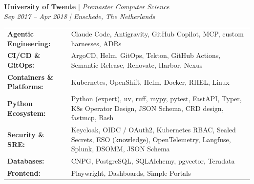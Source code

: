 \documentclass[a4paper]{deedy-resume} %
\begin{document}
\noindent \textbf{University of Twente} | \textit{Premaster Computer Science} \\
\textit{Sep 2017 – Apr 2018 | Enschede, The Netherlands}

\begin{tabular}{ll}
\textbf{Agentic Engineering:} & Claude Code, Antigravity, GitHub Copilot, MCP, custom harnesses, ADRs \\
\textbf{CI/CD \& GitOps:} & ArgoCD, Helm, GitOps, Tekton, GitHub Actions, Semantic Release, Renovate, Harbor, Nexus \\
\textbf{Containers \& Platforms:} & Kubernetes, OpenShift, Helm, Docker, RHEL, Linux \\
\textbf{Python Ecosystem:} & Python (expert), uv, ruff, mypy, pytest, FastAPI, Typer, K8s Operator Design, JSON Schema, CRD design, fastmcp, Bash \\
\textbf{Security \& SRE:} & Keycloak, OIDC / OAuth2, Kubernetes RBAC, Sealed Secrets, ESO (knowledge), OpenTelemetry, Langfuse, Splunk, DSOMM, JSON Schema \\
\textbf{Databases:} & CNPG, PostgreSQL, SQLAlchemy, pgvector, Teradata \\
\textbf{Frontend:} & Playwright, Dashboards, Simple Portals \\
\end{tabular}

\endgroup
\end{document}
